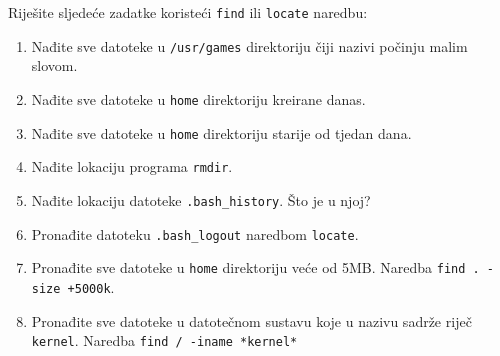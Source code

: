 \begin{zadatak} Riješite sljedeće zadatke koristeći \texttt{find} ili \texttt{locate} naredbu:
\begin{enumerate}
 \item Nađite sve datoteke u \texttt{/usr/games} direktoriju čiji nazivi počinju malim slovom.
 \item Nađite sve datoteke u \texttt{home} direktoriju kreirane danas.
 \item Nađite sve datoteke u \texttt{home} direktoriju starije od tjedan dana.
 \item Nađite lokaciju programa \texttt{rmdir}.
 \item Nađite lokaciju datoteke \texttt{.bash\_history}. Što je u njoj?

 \item Pronađite datoteku \texttt{.bash\_logout} naredbom \texttt{locate}.
\item Pronađite sve datoteke u \texttt{home} direktoriju veće od 5MB. Naredba \texttt{find . -size +5000k}.
\item Pronađite sve datoteke u datotečnom sustavu koje u nazivu sadrže riječ \texttt{kernel}. Naredba \texttt{find / -iname *kernel*}

\end{enumerate}
\end{zadatak}
\begin{comment}

\end{comment}




